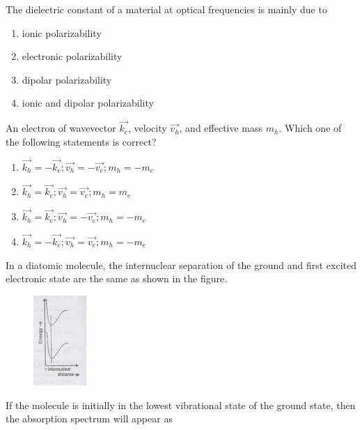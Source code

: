     \item The dielectric constant of a material at optical frequencies is mainly due to 
    \begin{enumerate}
    	\item ionic polarizability
    	\item electronic polarizability
    	\item dipolar polarizability
    	\item ionic and dipolar polarizability
    \end{enumerate}
    \item An electron of wavevector $\vec{k_e}$, velocity $\vec{v_h}$, and effective mass $m_h$. Which one of the following statements is correct?
    \begin{enumerate}
    	\item $\vec{k_h}=-\vec{k_e};\vec{v_h}=-\vec{v_e};m_h=-m_e$
    	\item $\vec{k_h}=\vec{k_e};\vec{v_h}=\vec{v_e};m_h=m_e$
    	\item $\vec{k_h}=\vec{k_e};\vec{v_h}=-\vec{v_e};m_h=-m_e$
    	\item $\vec{k_h}=-\vec{k_e};\vec{v_h}=\vec{v_e};m_h=-m_e$
   \end{enumerate}
    \item In a diatomic molecule, the internuclear separation of the ground and first excited electronic state are the same as shown in the figure.
    \begin{figure}[!ht]
    \centering
    \includegraphics[width=2cm]{./GATE-yearwise/2009/figs/Q30.png}
    \caption{}
    \end{figure}
    \newpage
     If the molecule is initially in the lowest vibrational state of the ground state, then the absorption spectrum will appear as
